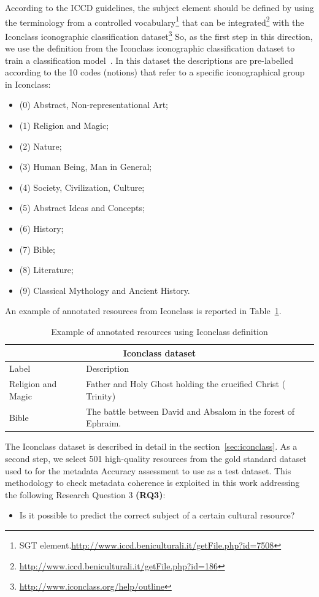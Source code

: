 \documentclass[epsfig,a4paper,12pt,titlepage]{book}
\begin{document}
According to the ICCD guidelines, the subject element should be defined by using the terminology from a controlled vocabulary\footnote{SGT element.\url{http://www.iccd.beniculturali.it/getFile.php?id=7508}} that can be integrated\footnote{\url{http://www.iccd.beniculturali.it/getFile.php?id=186}} with the Iconclass iconographic classification dataset\footnote{\url{http://www.iconclass.org/help/outline}}
So, as the first step in this direction, we use the definition from the Iconclass iconographic classification dataset to train a classification model~\cite{couprie1983iconclass}. In this dataset the descriptions are pre-labelled according to the 10 codes (notions) that refer to a specific iconographical group in Iconclass: 

\begin{itemize}
    \item (0) Abstract, Non-representational Art;
    \item (1) Religion and Magic;
    \item (2) Nature;
    \item (3) Human Being, Man in General;
    \item (4) Society, Civilization, Culture;
    \item (5) Abstract Ideas and Concepts;
    \item (6) History;
    \item (7) Bible;
    \item (8) Literature;
    \item (9) Classical Mythology and Ancient History.
\end{itemize}
An example of annotated resources from Iconclass is reported in Table~\ref{tab:iconclass}. 
\begin{table}[h!]
    \centering

  \begin{tabular}{ |l|m{12cm}| }
  \hline
  \multicolumn{2}{|c|}{Iconclass dataset} \\
  \hline
  Label  & Description \\ \hline
  Religion and Magic & Father and Holy Ghost holding the crucified Christ (~ Trinity)  \\ \hline
  Bible & The battle between David and Absalom in the forest of Ephraim.\\ \hline
  \hline
\end{tabular}

    \caption{Example of annotated resources using Iconclass definition}
		\label{tab:iconclass}       %
\end{table}
\begin{center}
\end{center}
The Iconclass dataset is described in detail in the section~\ref{sec:iconclass}.
As a second step, we select 501 high-quality resources from the gold standard dataset used to for the metadata Accuracy assessment to use as a test dataset.
This methodology to check metadata coherence is exploited in this work addressing the following Research Question 3 \textbf{(RQ3)}:
\begin{itemize}
    \item Is it possible to predict the correct subject of a certain cultural resource?
\end{itemize}
\end{document}

